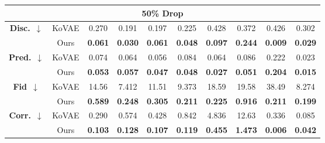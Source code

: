 \documentclass{article}
\theoremstyle{plain}
\theoremstyle{definition}
\theoremstyle{remark}
\begin{document}
\begin{table}[!t]
{\begin{tabular}{cc|cccccccc}
    \multicolumn{10}{c}{\textbf{50\% Drop}} \\
    \midrule
    \multirow{2}{*}{\textbf{Disc.}~$\downarrow$}
      & KoVAE 
          & 0.270 
          & 0.191 
          & 0.197 
          & 0.225 
          & 0.428 
          & 0.372 
          & 0.426 
          & 0.302 \\
      & Ours  
          & \cellcolor{blue!10}\textbf{0.061}
          & \cellcolor{blue!10}\textbf{0.030}
          & \cellcolor{blue!10}\textbf{0.061}
          & \cellcolor{blue!10}\textbf{0.048}
          & \cellcolor{blue!10}\textbf{0.097}
          & \cellcolor{blue!10}\textbf{0.244}
          & \cellcolor{blue!10}\textbf{0.009}
          & \cellcolor{blue!10}\textbf{0.029} \\
    \midrule
    \multirow{2}{*}{\textbf{Pred.}~$\downarrow$}
      & KoVAE 
          & 0.074 
          & 0.064 
          & 0.056 
          & 0.084 
          & 0.064 
          & 0.086 
          & 0.222 
          & 0.023 \\
      & Ours  
          & \cellcolor{blue!10}\textbf{0.053}
          & \cellcolor{blue!10}\textbf{0.057}
          & \cellcolor{blue!10}\textbf{0.047}
          & \cellcolor{blue!10}\textbf{0.048}
          & \cellcolor{blue!10}\textbf{0.027}
          & \cellcolor{blue!10}\textbf{0.051}
          & \cellcolor{blue!10}\textbf{0.204}
          & \cellcolor{blue!10}\textbf{0.015} \\
    \midrule
    \multirow{2}{*}{\textbf{Fid}~$\downarrow$}
      & KoVAE 
          & 14.56 
          & 7.412 
          & 11.51 
          & 9.373 
          & 18.59 
          & 19.58 
          & 38.49 
          & 8.274 \\
      & Ours  
          & \cellcolor{blue!10}\textbf{0.589}
          & \cellcolor{blue!10}\textbf{0.248}
          & \cellcolor{blue!10}\textbf{0.305}
          & \cellcolor{blue!10}\textbf{0.211}
          & \cellcolor{blue!10}\textbf{0.225}
          & \cellcolor{blue!10}\textbf{0.916}
          & \cellcolor{blue!10}\textbf{0.211}
          & \cellcolor{blue!10}\textbf{0.199} \\
    \midrule
    \multirow{2}{*}{\textbf{Corr.}~$\downarrow$}
      & KoVAE 
          & 0.290 
          & 0.574 
          & 0.428 
          & 0.842 
          & 4.836 
          & 12.63 
          & 0.336 
          & 0.085 \\
      & Ours  
          & \cellcolor{blue!10}\textbf{0.103}
          & \cellcolor{blue!10}\textbf{0.128}
          & \cellcolor{blue!10}\textbf{0.107}
          & \cellcolor{blue!10}\textbf{0.119}
          & \cellcolor{blue!10}\textbf{0.455}
          & \cellcolor{blue!10}\textbf{1.473}
          & \cellcolor{blue!10}\textbf{0.006}
          & \cellcolor{blue!10}\textbf{0.042} \\
    \midrule
    

\end{tabular}}
\end{table}
\end{document}
